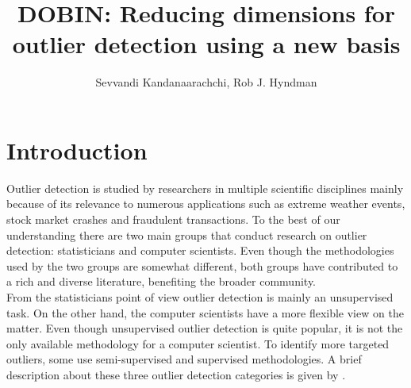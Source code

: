 \documentclass[11pt]{article}
\begin{document}
\title{DOBIN: Reducing dimensions for outlier detection using a new basis}
\author{Sevvandi Kandanaarachchi, Rob J. Hyndman}
\maketitle
{}

\section{Introduction}
Outlier detection is studied by researchers in multiple scientific disciplines mainly because of its relevance to numerous applications such as extreme weather events, stock market crashes and fraudulent transactions. To the best of our understanding there are two main groups that conduct research on outlier detection:  statisticians and computer scientists. Even though the methodologies used by the two groups are somewhat different, both groups have contributed to a rich and diverse literature, benefiting the broader community. \\ 

From the statisticians point of view outlier detection is mainly an unsupervised task. On the other hand, the computer scientists have a more flexible view on the matter. Even though unsupervised outlier detection is quite popular, it is not the only  available methodology for a computer scientist.  To identify more targeted outliers, some use  semi-supervised and supervised methodologies. A brief description about these three outlier detection categories is given by \cite{goldstein2016comparative}. \\
\end{document}
